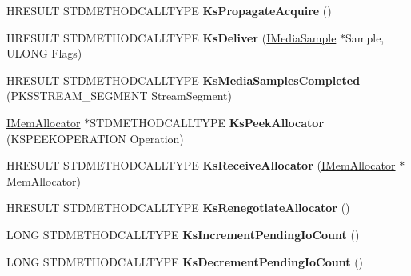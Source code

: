 \begin{DoxyCompactItemize}
\item 
\mbox{\label{class_c_output_pin_abafa563b559092a3a345a3e4daa134a5}} 
H\+R\+E\+S\+U\+LT S\+T\+D\+M\+E\+T\+H\+O\+D\+C\+A\+L\+L\+T\+Y\+PE {\bfseries Ks\+Propagate\+Acquire} ()
\item 
\mbox{\label{class_c_output_pin_a3c8b367ad8f7c8a1a632f801082d58c4}} 
H\+R\+E\+S\+U\+LT S\+T\+D\+M\+E\+T\+H\+O\+D\+C\+A\+L\+L\+T\+Y\+PE {\bfseries Ks\+Deliver} (\hyperlink{interface_i_media_sample}{I\+Media\+Sample} $\ast$Sample, U\+L\+O\+NG Flags)
\item 
\mbox{\label{class_c_output_pin_ac32adbb7dd85e9643ddcacc426522152}} 
H\+R\+E\+S\+U\+LT S\+T\+D\+M\+E\+T\+H\+O\+D\+C\+A\+L\+L\+T\+Y\+PE {\bfseries Ks\+Media\+Samples\+Completed} (P\+K\+S\+S\+T\+R\+E\+A\+M\+\_\+\+S\+E\+G\+M\+E\+NT Stream\+Segment)
\item 
\mbox{\label{class_c_output_pin_afa364446d7cb1270ac63cb6fa2ca6613}} 
\hyperlink{interface_i_mem_allocator}{I\+Mem\+Allocator} $\ast$S\+T\+D\+M\+E\+T\+H\+O\+D\+C\+A\+L\+L\+T\+Y\+PE {\bfseries Ks\+Peek\+Allocator} (K\+S\+P\+E\+E\+K\+O\+P\+E\+R\+A\+T\+I\+ON Operation)
\item 
\mbox{\label{class_c_output_pin_a1c638587bdf97fa59e0db4e8e90fbcdc}} 
H\+R\+E\+S\+U\+LT S\+T\+D\+M\+E\+T\+H\+O\+D\+C\+A\+L\+L\+T\+Y\+PE {\bfseries Ks\+Receive\+Allocator} (\hyperlink{interface_i_mem_allocator}{I\+Mem\+Allocator} $\ast$Mem\+Allocator)
\item 
\mbox{\label{class_c_output_pin_afc04891d060dea5cc9f81122324920a6}} 
H\+R\+E\+S\+U\+LT S\+T\+D\+M\+E\+T\+H\+O\+D\+C\+A\+L\+L\+T\+Y\+PE {\bfseries Ks\+Renegotiate\+Allocator} ()
\item 
\mbox{\label{class_c_output_pin_affe3fe311c2d084340dd9aef24945fd7}} 
L\+O\+NG S\+T\+D\+M\+E\+T\+H\+O\+D\+C\+A\+L\+L\+T\+Y\+PE {\bfseries Ks\+Increment\+Pending\+Io\+Count} ()
\item 
\mbox{\label{class_c_output_pin_a8feec055f55762ae103596421f1e020a}} 
L\+O\+NG S\+T\+D\+M\+E\+T\+H\+O\+D\+C\+A\+L\+L\+T\+Y\+PE {\bfseries Ks\+Decrement\+Pending\+Io\+Count} ()

\end{DoxyCompactItemize}

